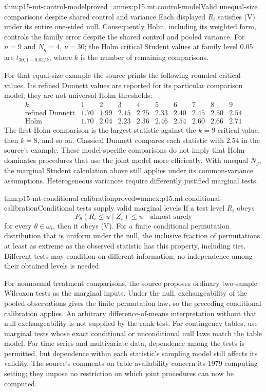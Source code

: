 \begin{hblemma}{thm:p15-mt-control-model}{proved=annex:p15.mt.control-model}{Valid unequal-size comparisons despite shared control and variance}
Each displayed \(R_i\) satisfies (V) under its entire one-sided null.
Consequently Holm, including its weighted form, controls the family error
despite the shared control and pooled variance.
For \(n=9\) and \(N_g=4\), \(\nu=30\); the Holm critical Student values
at family level \(0.05\) are \(t_{30,1-0.05/k}\), where \(k\) is the
number of remaining comparisons.
\end{hblemma}

For that equal-size example the source prints the following rounded
critical values. Its refined Dunnett values are reported for its
particular comparison model; they are not universal Holm thresholds:
\[
\begin{array}{c|rrrrrrrrr}
 k&1&2&3&4&5&6&7&8&9\\ \hline
 \text{refined Dunnett}&1.70&1.99&2.15&2.25&2.33&2.40&2.45&2.50&2.54\\
 \text{Holm}&1.70&2.04&2.23&2.36&2.46&2.54&2.60&2.66&2.71
\end{array}
\]
The first Holm comparison is the largest statistic against the \(k=9\)
critical value, then \(k=8\), and so on. Classical Dunnett compares
each statistic with \(2.54\) in the source's example.
These model-specific comparisons do not imply that Holm dominates
procedures that use the joint model more efficiently.
With unequal \(N_g\), the marginal Student calculation above still
applies under its common-variance assumptions. Heterogeneous variances
require differently justified marginal tests.

\begin{hblemma}{thm:p15-mt-conditional-calibration}{proved=annex:p15.mt.conditional-calibration}{Conditional tests supply valid marginal levels}
If a test level \(R_i\) obeys
\[
          P_\theta(R_i\leq u\mid Z_i)\leq u\quad\text{almost surely}
\]
for every \(\theta\in\omega_i\), then it obeys (V).
For a finite conditional permutation distribution that is uniform under
the null, the inclusive fraction of permutations at least as extreme
as the observed statistic has this property, including ties.
Different tests may condition on different information; no independence
among their obtained levels is needed.
\end{hblemma}

For nonnormal treatment comparisons, the source proposes ordinary
two-sample Wilcoxon tests as the marginal inputs. Under the null,
exchangeability of the pooled observations gives the finite permutation
law, so the preceding conditional calibration applies.
An arbitrary difference-of-means interpretation without that null
exchangeability is not supplied by the rank test.
For contingency tables, use marginal tests whose exact conditional or
unconditional null laws match the table model. For time series and
multivariate data, dependence among the tests is permitted, but dependence
within each statistic's sampling model still affects its validity.
The source's comments on table availability concern its 1979 computing
setting; they impose no restriction on which joint procedures can now
be computed.

